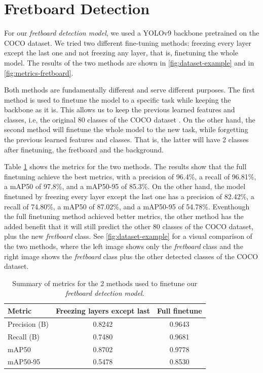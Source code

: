 \documentclass[10pt,twocolumn,letterpaper]{article}
\begin{document}
\section{Fretboard Detection}
For our \emph{fretboard detection model}, we used a YOLOv9 backbone \cite{wang2024yolov9} pretrained on the COCO dataset. We tried two different fine-tuning methods: freezing every layer except the last one and not freezing any layer, that is, finetuning the whole model. The results of the two methods are shown in \cref{fig:dataset-example} and in \cref{fig:metrics-fretboard}. 

Both methods are fundamentally different and serve different purposes. The first method is used to finetune the model to a specific task while keeping the backbone as it is. This allows us to keep the previous learned features and classes, i.e, the original 80 classes of the COCO dataset \cite{lin2015microsoftcococommonobjects}. On the other hand, the second method will finetune the whole model to the new task, while forgetting the previous learned features and classes. That is, the latter will have 2 classes after finetuning, the fretboard and the background.

Table \ref{tab:fretboard-metrics} shows the metrics for the two methods. The results show that the full finetuning achieve the best metrics, with a precision of 96.4\%, a recall of 96.81\%, a mAP50 of 97.8\%, and a mAP50-95 of 85.3\%. On the other hand, the model finetuned by freezing every layer except the last one has a precision of 82.42\%, a recall of 74.80\%, a mAP50 of 87.02\%, and a mAP50-95 of 54.78\%. Eventhough the full finetuning method achieved better metrics, the other method has the added benefit that it will still predict the other 80 classes of the COCO dataset, plus the new \emph{fretboard} class. See \cref{fig:dataset-example} for a visual comparison of the two methods, where the left image shows only the \emph{fretboard} class and the right image shows the \emph{fretboard} class plus the other detected classes of the COCO dataset.

\begin{table}[h!]
    \centering
    \caption{Summary of metrics for the 2 methods used to finetune our \emph{fretboard detection model}.}
    \begin{tabular}{lcc}
        \toprule
        \textbf{Metric} & \textbf{Freezing layers except last} & \textbf{Full finetune} \\
        \midrule
        Precision (B)   & 0.8242 & 0.9643 \\
        Recall (B)      & 0.7480 & 0.9681 \\
        mAP50           & 0.8702 & 0.9778 \\
        mAP50-95        & 0.5478 & 0.8530 \\
        \bottomrule
    \end{tabular}
    \label{tab:fretboard-metrics}
\end{table}
\end{document}
